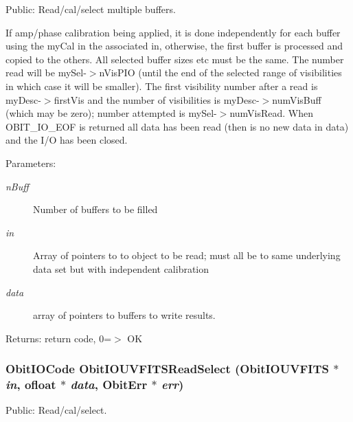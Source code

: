 Public: Read/cal/select multiple buffers. 

If amp/phase calibration being applied, it is done independently for each buffer using the my\-Cal in the associated in, otherwise, the first buffer is processed and copied to the others. All selected buffer sizes etc must be the same. The number read will be my\-Sel-$>$n\-Vis\-PIO (until the end of the selected range of visibilities in which case it will be smaller). The first visibility number after a read is my\-Desc-$>$first\-Vis and the number of visibilities is my\-Desc-$>$num\-Vis\-Buff (which may be zero); number attempted is my\-Sel-$>$num\-Vis\-Read. When OBIT\_\-IO\_\-EOF is returned all data has been read (then is no new data in data) and the I/O has been closed. \begin{Desc}
\item[Parameters:]
\begin{description}
\item[{\em n\-Buff}]Number of buffers to be filled \item[{\em in}]Array of pointers to to object to be read; must all be to same underlying data set but with independent calibration \item[{\em data}]array of pointers to buffers to write results. \end{description}
\end{Desc}
\begin{Desc}
\item[Returns:]return code, 0=$>$ OK \end{Desc}
\subsubsection{\setlength{\rightskip}{0pt plus 5cm}Obit\-IOCode Obit\-IOUVFITSRead\-Select ({\bf Obit\-IOUVFITS} $\ast$ {\em in}, {\bf ofloat} $\ast$ {\em data}, {\bf Obit\-Err} $\ast$ {\em err})}\label{ObitIOUVFITS_8h_a14}


Public: Read/cal/select. 

